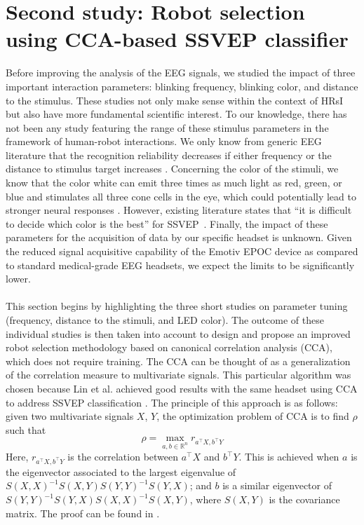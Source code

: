 \documentclass[smallextended]{svjour3}
\begin{document}
\section{Second study: Robot selection using CCA-based SSVEP classifier}
\label{sec:CCA_approach}
Before improving the analysis of the EEG signals, we studied the impact of three important interaction parameters: blinking frequency, blinking color, and distance to the stimulus. 
These studies not only make sense within the context of HRsI but also have more fundamental scientific interest. 
To our knowledge, there has not been any study featuring the range of these stimulus parameters in the framework of human-robot interactions. We only know from generic EEG literature that the recognition reliability decreases if either frequency or the distance to stimulus target increases \cite{herrmann2001,wu2013effect}. 
Concerning the color of the stimuli, we know that the color white can emit three times as much light as red, green, or blue and stimulates all three cone cells in the eye, which could potentially lead to stronger neural responses \cite{aljshamee2016discriminate,cao2012flashing}. 
However, existing literature states that ``it is difficult to decide which color is the best'' for SSVEP~\cite{Zhu2010}.
Finally, the impact of these parameters for the acquisition of data by our specific headset is unknown. 
Given the reduced signal acquisitive capability of the Emotiv EPOC device as compared to standard medical-grade EEG headsets, we expect the limits to be significantly lower.\\
\\
This section begins by highlighting the three short studies on parameter tuning (frequency, distance to the stimuli, and LED color). The outcome of these individual studies is then taken into account to design and propose an improved robot selection methodology based on canonical correlation analysis (CCA), which does not require training. 
The CCA can be thought of as a generalization of the correlation measure to multivariate signals. 
This particular algorithm was chosen because Lin et al. achieved good results with the same headset using CCA to address SSVEP classification \cite{Lin2014}. The principle of this approach is as follows: given two multivariate signals $X$, $Y$, the optimization problem of CCA is to find $\rho$ such that
\\
\begin{equation}
\label{rho}
\rho = \max_{a, b \in \mathbb R^n} r_{ a^\top X, b^\top Y}
\end{equation}
Here, $r_{a^\top X, b^\top Y}$ is the correlation between $a^\top X$ and $b^\top Y$. This is achieved when $a$ is the eigenvector associated to the largest eigenvalue of $S(X, X)^{-1} S(X,Y) S(Y, Y)^{-1} S(Y, X)$; and $b$ is a similar eigenvector of $S(Y, Y)^{-1} S(Y, X) S(X, X)^{-1} S(X, Y)$, where $S(X, Y)$ is the covariance matrix. The proof can be found in \cite{rencher2003}.
\end{document}
